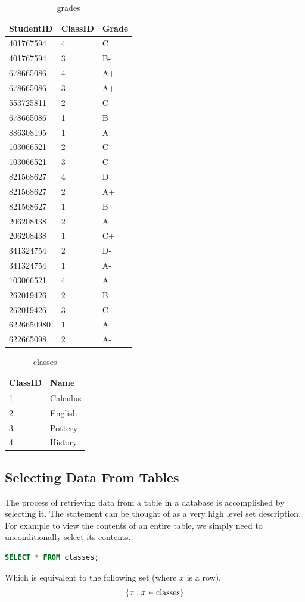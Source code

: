 \begin{problem}
\begin{table}[H]
\begin{tabular}{|l|l|l|}
\hline
StudentID & ClassID & Grade \\
\hline
401767594 & 4 & C \\
401767594 & 3 & B- \\
678665086 & 4 & A+ \\
678665086 & 3 & A+ \\
553725811 & 2 & C \\
678665086 & 1 & B \\
886308195 & 1 & A \\
103066521 & 2 & C \\
103066521 & 3 & C- \\
821568627 & 4 & D \\
821568627 & 2 & A+ \\
821568627 & 1 & B \\
206208438 & 2 & A \\
206208438 & 1 & C+ \\
341324754 & 2 & D- \\
341324754 & 1 & A- \\
103066521 & 4 & A \\
262019426 & 2 & B \\
262019426 & 3 & C \\
6226650980 & 1 & A \\
622665098 & 2 & A- \\
\hline
\end{tabular}
\caption{grades}
\end{table}

\begin{table}[H]
\begin{tabular}{|l|l|}
\hline
ClassID & Name \\
\hline
1 & Calculus \\
2 & English \\
3 & Pottery \\
4 & History \\
\hline
\end{tabular}
\caption{classes}
\end{table}
\label{prob:sampletables}
\end{problem}


\subsection*{Selecting Data From Tables}
The process of retrieving data from a table in a database is accomplished by selecting it.
The  statement can be thought of as a very high level set description.
For example to view the contents of an entire table, we simply need to unconditionally select its contents.
\begin{lstlisting}[language=SQL]
SELECT * FROM classes;
\end{lstlisting}
Which is equivalent to the following set (where $x$ is a row).
\[ \lbrace x:x \in \text{classes}\rbrace \]

